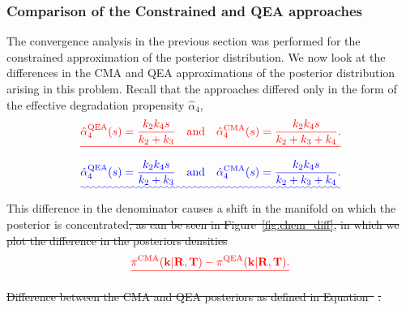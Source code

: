 \documentclass[final]{siamltex}
\providecommand{\DIFadd}[1]{{\protect\color{blue}\uwave{#1}}} %
\providecommand{\DIFdel}[1]{{\protect\color{red}\sout{#1}}}                      %
\providecommand{\DIFaddbegin}{} %
\providecommand{\DIFaddend}{} %
\providecommand{\DIFdelbegin}{} %
\providecommand{\DIFdelend}{} %
\providecommand{\DIFdelFL}[1]{\DIFdel{#1}} %
\newcommand{\DIFscaledelfig}{0.5}
\newlength{\DIFdelgraphicswidth} %
\newlength{\DIFdelgraphicsheight} %
\newcommand{\DIFaddincludegraphics}[2][]{{\color{blue}\fbox{\DIFOincludegraphics[#1]{#2}}}} %
\newcommand{\DIFdelincludegraphics}[2][]{%
\sbox{\DIFdelgraphicsbox}{\DIFOincludegraphics[#1]{#2}}%
\settoboxwidth{\DIFdelgraphicswidth}{\DIFdelgraphicsbox} %
\settoboxtotalheight{\DIFdelgraphicsheight}{\DIFdelgraphicsbox} %
\scalebox{\DIFscaledelfig}{%
\parbox[b]{\DIFdelgraphicswidth}{\usebox{\DIFdelgraphicsbox}\\[-\baselineskip] \rule{\DIFdelgraphicswidth}{0em}}\llap{\resizebox{\DIFdelgraphicswidth}{\DIFdelgraphicsheight}{%
\setlength{\unitlength}{\DIFdelgraphicswidth}%
\begin{picture}(1,1)%
\thicklines\linethickness{2pt} %
{\color[rgb]{1,0,0}\put(0,0){\framebox(1,1){}}}%
{\color[rgb]{1,0,0}\put(0,0){\line( 1,1){1}}}%
{\color[rgb]{1,0,0}\put(0,1){\line(1,-1){1}}}%
\end{picture}%
}\hspace*{3pt}}} %
} %
\DeclareRobustCommand{\DIFaddbegin}{\DIFOaddbegin \let\includegraphics\DIFaddincludegraphics} %
\DeclareRobustCommand{\DIFaddend}{\DIFOaddend \let\includegraphics\DIFOincludegraphics} %
\DeclareRobustCommand{\DIFdelbegin}{\DIFOdelbegin \let\includegraphics\DIFdelincludegraphics} %
\DeclareRobustCommand{\DIFdelend}{\DIFOaddend \let\includegraphics\DIFOincludegraphics} %
\begin{document}
\DIFaddend \subsubsection{Comparison of the Constrained and QEA approaches}

The convergence analysis in the previous section was performed for the constrained
approximation of the posterior distribution. We now look at the
differences in the CMA and QEA approximations of the posterior distribution
arising in this problem. Recall that the approaches differed only in the form of the effective degradation propensity $\hat{\alpha}_4$,
\DIFdelbegin \[
	\DIFdel{\hat{\alpha}_4^{\text{QEA}}(s) = \frac{k_2k_4s}{k_2+k_3} \quad \text{and} \quad \hat{\alpha}_4^{\text{CMA}}(s) = \frac{k_2k_4s}{k_2+k_3+k_4}.
}\]
\DIFdelend \DIFaddbegin \begin{equation}
	\DIFadd{\hat{\alpha}_4^{\text{QEA}}(s) = \frac{k_2k_4s}{k_2+k_3} \quad \text{and} \quad \hat{\alpha}_4^{\text{CMA}}(s) = \frac{k_2k_4s}{k_2+k_3+k_4}.
}\end{equation}
\DIFaddend This difference in the denominator causes a shift in the manifold on
which the posterior is concentrated\DIFdelbegin \DIFdel{, as can be seen in
Figure~\ref{fig:chem_diff}, in which we plot the difference in the 
posteriors densities
}\begin{displaymath}\DIFdel{\label{eqn:chem_diff}\pi^{\text{CMA}}(\mathbf{k}|\mathbf{R},\mathbf{T}) - \pi^{\text{QEA}}(\mathbf{k}|\mathbf{R},\mathbf{T}).
}\end{displaymath}
\DIFdelend \DIFaddbegin \DIFadd{.
}\DIFaddend 

\DIFdelbegin %
{%
\DIFdelFL{Difference between the CMA and QEA posteriors as defined in Equation~}%
\DIFdelFL{.}}
\DIFdelend %
\end{document}
